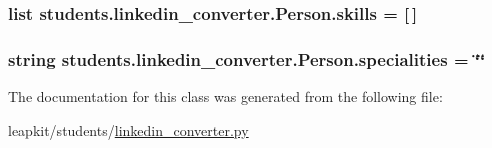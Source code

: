 \hypertarget{classstudents_1_1linkedin__converter_1_1_person_a9e7d26cf8c69ccb6bb34e6c5c8dc0873}{
\subsubsection[{skills}]{\setlength{\rightskip}{0pt plus 5cm}list students.\-linkedin\-\_\-converter.\-Person.\-skills = \mbox{[}$\,$\mbox{]}\hspace{0.3cm}{\ttfamily [static]}}}\label{classstudents_1_1linkedin__converter_1_1_person_a9e7d26cf8c69ccb6bb34e6c5c8dc0873}
\hypertarget{classstudents_1_1linkedin__converter_1_1_person_acd8938604a06b662b9b1445ccf359755}{
\subsubsection[{specialities}]{\setlength{\rightskip}{0pt plus 5cm}string students.\-linkedin\-\_\-converter.\-Person.\-specialities = \char`\"{}\char`\"{}\hspace{0.3cm}{\ttfamily [static]}}}\label{classstudents_1_1linkedin__converter_1_1_person_acd8938604a06b662b9b1445ccf359755}


The documentation for this class was generated from the following file\-:\begin{DoxyCompactItemize}
\item 
leapkit/students/\hyperlink{linkedin__converter_8py}{linkedin\-\_\-converter.\-py}\end{DoxyCompactItemize}
